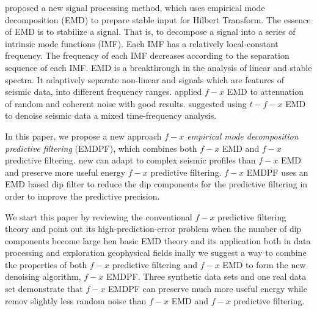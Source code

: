 \cite{emd} proposed a new signal processing method, which uses empirical mode decomposition (EMD) to prepare stable input for  Hilbert Transform. 
The essence of EMD is to stabilize a  signal. That is, to decompose a signal into a series of intrinsic mode functions (IMF). Each IMF has a relatively local-constant frequency. The frequency of each IMF decreases according to the separation sequence of each IMF.  EMD is a breakthrough in the analysis of linear and stable spectra. It adaptively separate non-linear and  signals\wen{,} which are features of seismic data, into different frequency ranges. 
\cite{bekara} applied $f-x$ EMD to attenuation of random and coherent noise\wen{,} with good results. \cite{cai} suggested using $t-f-x$ EMD to denoise seismic data  a mixed time-frequency analysis. 

In this paper, we propose a new approach  \emph{$f-x$ empirical mode decomposition predictive filtering} (EMDPF), 
which combines both $f-x$ EMD and $f-x$ predictive filtering.  new   can adapt to  complex seismic profiles than $f-x$ EMD\old{,} and preserve more useful energy   $f-x$ predictive filtering. $f-x$ EMDPF uses an EMD based dip filter to reduce the dip components for the  predictive filtering in order to improve the predictive precision.

We start this paper by reviewing the conventional $f-x$ predictive filtering theory and point out its high-prediction-error problem when the number of dip components become large\dlo{,} hen   basic EMD theory and its application\wen{,} both in data processing and  exploration geophysical fields\dlo{,} inally\wen{,} we suggest a way to combine the properties of both $f-x$ predictive filtering and $f-x$ EMD  to form the new denoising algorithm, $f-x$ EMDPF. Three synthetic data sets and one real data set demonstrate that $f-x$ EMDPF can preserve much more useful energy while remov slightly less random noise than $f-x$ EMD and $f-x$ predictive filtering.

